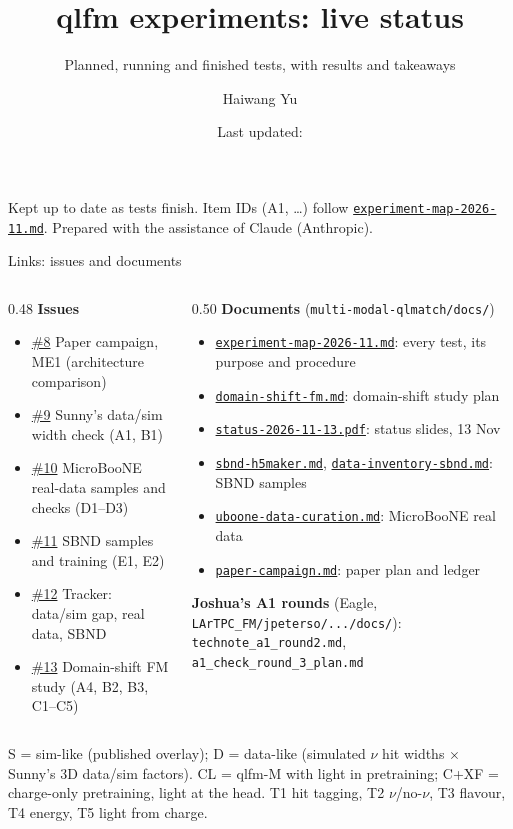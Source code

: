 \documentclass[aspectratio=169,10pt]{beamer}
\title{qlfm experiments: live status}
\subtitle{Planned, running and finished tests, with results and takeaways}
\author{Haiwang Yu}
\institute{fm4npp-lartpc \;\textbullet\; issues \iss{8}--\iss{13}}
\date{Last updated: \updated}
\newcommand{\gh}{https://github.com/HaiwangYu/fm4npp-lartpc}
\newcommand{\iss}[1]{\href{\gh/issues/#1}{\color{blue!60!black}\##1}}
\newcommand{\doc}[1]{\href{\gh/blob/main/multi-modal-qlmatch/docs/#1}{\color{blue!60!black}\texttt{#1}}}
\begin{document}
\begin{frame}
  \titlepage
  \vfill
  {\tiny Kept up to date as tests finish. Item IDs (A1, \dots) follow \doc{experiment-map-2026-11.md}.
  Prepared with the assistance of Claude (Anthropic).}
\end{frame}

\begin{frame}{Links: issues and documents}
  \footnotesize
  \begin{columns}[T]
    \begin{column}{0.48\textwidth}
      \textbf{Issues}
      \begin{itemize}
        \item \iss{8} Paper campaign, ME1 (architecture comparison)
        \item \iss{9} Sunny's data/sim width check (A1, B1)
        \item \iss{10} MicroBooNE real-data samples and checks (D1--D3)
        \item \iss{11} SBND samples and training (E1, E2)
        \item \iss{12} Tracker: data/sim gap, real data, SBND
        \item \iss{13} Domain-shift FM study (A4, B2, B3, C1--C5)
      \end{itemize}
    \end{column}
    \begin{column}{0.50\textwidth}
      \textbf{Documents} (\texttt{multi-modal-qlmatch/docs/})
      \begin{itemize}
        \item \doc{experiment-map-2026-11.md}: every test, its purpose and procedure
        \item \doc{domain-shift-fm.md}: domain-shift study plan
        \item \doc{status-2026-11-13.pdf}: status slides, 13 Nov
        \item \doc{sbnd-h5maker.md}, \doc{data-inventory-sbnd.md}: SBND samples
        \item \doc{uboone-data-curation.md}: MicroBooNE real data
        \item \doc{paper-campaign.md}: paper plan and ledger
      \end{itemize}
      \textbf{Joshua's A1 rounds} (Eagle, \texttt{LArTPC\_FM/jpeterso/.../docs/}):
      \texttt{technote\_a1\_round2.md}, \texttt{a1\_check\_round\_3\_plan.md}
    \end{column}
  \end{columns}
  \vspace{4pt}
  {\scriptsize S = sim-like (published overlay); D = data-like (simulated $\nu$ hit widths $\times$ Sunny's 3D data/sim factors).
  CL = qlfm-M with light in pretraining; C+XF = charge-only pretraining, light at the head.
  T1 hit tagging, T2 $\nu$/no-$\nu$, T3 flavour, T4 energy, T5 light from charge.}
\end{frame}
\end{document}

